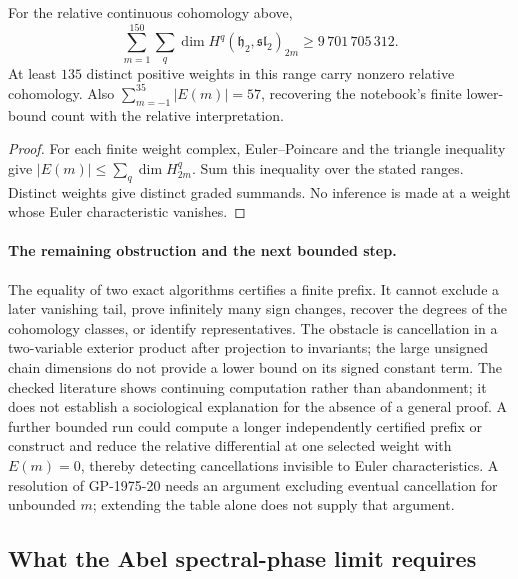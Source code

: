 \begin{corollary}\ours\quad
For the relative continuous cohomology above,
\[
 \sum_{m=1}^{150}\sum_q
    \dim H^q(\mathfrak h_2,\mathfrak{sl}_2)_{2m}
       \geq9\,701\,705\,312.
\]
At least \(135\) distinct positive weights in this range carry nonzero
relative cohomology. Also
\(\sum_{m=-1}^{35}|E(m)|=57\), recovering the notebook's finite
lower-bound count with the relative interpretation.
\end{corollary}
\begin{proof}
For each finite weight complex, Euler--Poincare and the triangle
inequality give \(|E(m)|\leq\sum_q\dim H^q_{2m}\). Sum this inequality
over the stated ranges. Distinct weights give distinct graded summands.
No inference is made at a weight whose Euler characteristic vanishes.
\end{proof}

\paragraph{The remaining obstruction and the next bounded step.}
The equality of two exact algorithms certifies a finite prefix. It cannot
exclude a later vanishing tail, prove infinitely many sign changes,
recover the degrees of the cohomology classes, or identify representatives.
The obstacle is cancellation in a two-variable exterior product after
projection to invariants; the large unsigned chain dimensions do not
provide a lower bound on its signed constant term. The checked literature
shows continuing computation rather than abandonment; it does not
establish a sociological explanation for the absence of a general proof.
A further bounded run could compute a longer independently certified
prefix or construct and reduce the relative differential at one selected
weight with \(E(m)=0\), thereby detecting cancellations invisible to Euler
characteristics. A resolution of GP-1975-20 needs an argument excluding
eventual cancellation for unbounded \(m\); extending the table alone
does not supply that argument.

\subsection{What the Abel spectral-phase limit requires}
\label{dev:spectralphases}

